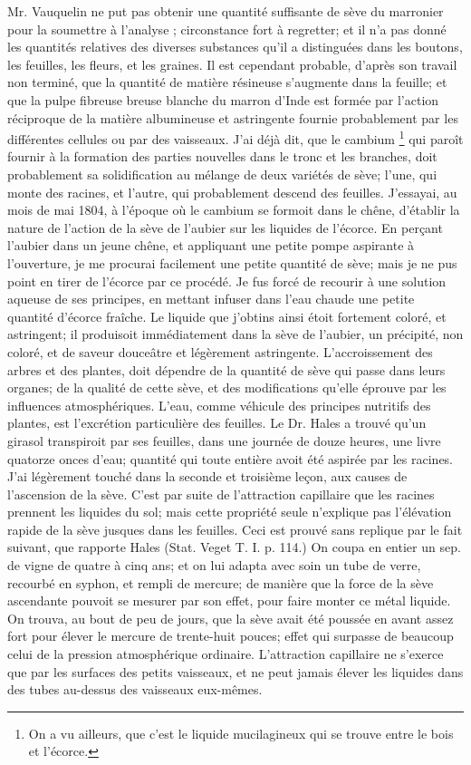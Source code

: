 Mr. Vauquelin ne put pas obtenir une quantité suffisante de sève du marronier pour la soumettre à l'analyse ; circonstance fort à regretter; et il n'a pas donné les quantités relatives des diverses substances qu'il a distinguées dans les boutons, les feuilles, les fleurs, et les graines. Il est cependant probable, d'après son travail non terminé, que la quantité de matière résineuse s'augmente dans la feuille; et que la pulpe fibreuse\setcounter{page}{89} breuse blanche du marron d'Inde est formée par l'action réciproque de la matière albumineuse et astringente fournie probablement par les différentes cellules ou par des vaisseaux. J'ai déjà dit, que le cambium \footnote{On a vu ailleurs, que c'est le liquide mucilagineux qui se trouve entre le bois et l'écorce.} qui paroît fournir à la formation des parties nouvelles dans le tronc et les branches, doit probablement sa solidification au mélange de deux variétés de sève; l'une, qui monte des racines, et l'autre, qui probablement descend des feuilles. J'essayai, au mois de mai 1804, à l'époque où le cambium se formoit dans le chêne, d'établir la nature de l'action de la sève de l'aubier sur les liquides de l'écorce. En perçant l'aubier dans un jeune chêne, et appliquant une petite pompe aspirante à l'ouverture, je me procurai facilement une petite quantité de sève; mais je ne pus point en tirer de l'écorce par ce procédé. Je fus forcé de recourir à une solution aqueuse de ses principes, en mettant infuser dans l'eau chaude une petite quantité d'écorce fraîche. Le liquide que j'obtins ainsi étoit fortement coloré, et astringent; il produisoit immédiatement\setcounter{page}{90} dans la sève de l'aubier, un précipité, non coloré, et de saveur douceâtre et légèrement astringente.
L'accroissement des arbres et des plantes, doit dépendre de la quantité de sève qui passe dans leurs organes; de la qualité de cette sève, et des modifications qu'elle éprouve par les influences atmosphériques. L'eau, comme véhicule des principes nutritifs des plantes, est l'excrétion particulière des feuilles. Le Dr. Hales a trouvé qu'un girasol transpiroit par ses feuilles, dans une journée de douze heures, une livre quatorze onces d'eau; quantité qui toute entière avoit été aspirée par les racines.
J'ai légèrement touché dans la seconde et troisième leçon, aux causes de l'ascension de la sève. C'est par suite de l'attraction capillaire que les racines prennent les liquides du sol; mais cette propriété seule n'explique pas l'élévation rapide de la sève jusques dans les feuilles. Ceci est prouvé sans replique par le fait suivant, que rapporte Hales (Stat. Veget T. I. p. 114.) On coupa en entier un sep. de vigne de quatre à cinq ans; et on lui adapta avec soin un tube de verre, recourbé en syphon, et rempli de mercure; de manière que la force de la sève ascendante pouvoit se mesurer\setcounter{page}{91} par son effet, pour faire monter ce métal liquide. On trouva, au bout de peu de jours, que la sève avait été poussée en avant assez fort pour élever le mercure de trente-huit pouces; effet qui surpasse de beaucoup celui de la pression atmosphérique ordinaire. L'attraction capillaire ne s'exerce que par les surfaces des petits vaisseaux, et ne peut jamais élever les liquides dans des tubes au-dessus des vaisseaux eux-mêmes.
